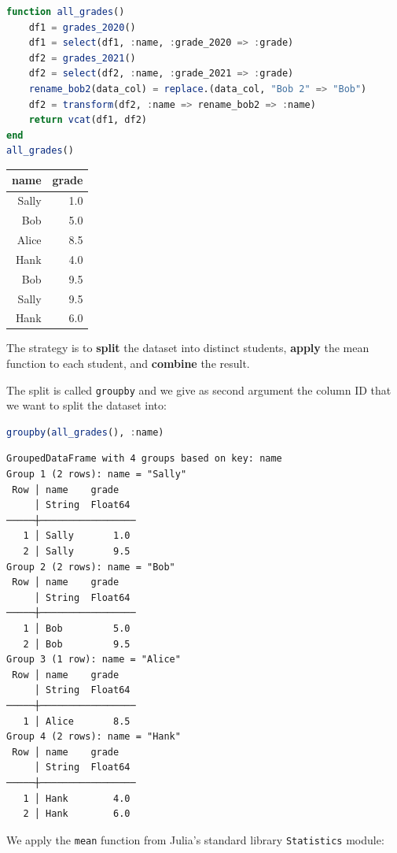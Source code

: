 \documentclass[
  notoc %
]{tufte-book}
\newcommand{\passthrough}[1]{#1}
\begin{document}
\begin{lstlisting}[language=Julia]
function all_grades()
    df1 = grades_2020()
    df1 = select(df1, :name, :grade_2020 => :grade)
    df2 = grades_2021()
    df2 = select(df2, :name, :grade_2021 => :grade)
    rename_bob2(data_col) = replace.(data_col, "Bob 2" => "Bob")
    df2 = transform(df2, :name => rename_bob2 => :name)
    return vcat(df1, df2)
end
all_grades()
\end{lstlisting}

\begin{longtable}[]{@{}rr@{}}
\toprule
name & grade \\
\midrule
\endhead
Sally & 1.0 \\
Bob & 5.0 \\
Alice & 8.5 \\
Hank & 4.0 \\
Bob & 9.5 \\
Sally & 9.5 \\
Hank & 6.0 \\
\bottomrule
\end{longtable}

The strategy is to \textbf{split} the dataset into distinct students,
\textbf{apply} the mean function to each student, and \textbf{combine}
the result.

The split is called \passthrough{\lstinline!groupby!} and we give as
second argument the column ID that we want to split the dataset into:

\begin{lstlisting}[language=Julia]
groupby(all_grades(), :name)
\end{lstlisting}

\begin{lstlisting}
GroupedDataFrame with 4 groups based on key: name
Group 1 (2 rows): name = "Sally"
 Row │ name    grade
     │ String  Float64
─────┼─────────────────
   1 │ Sally       1.0
   2 │ Sally       9.5
Group 2 (2 rows): name = "Bob"
 Row │ name    grade
     │ String  Float64
─────┼─────────────────
   1 │ Bob         5.0
   2 │ Bob         9.5
Group 3 (1 row): name = "Alice"
 Row │ name    grade
     │ String  Float64
─────┼─────────────────
   1 │ Alice       8.5
Group 4 (2 rows): name = "Hank"
 Row │ name    grade
     │ String  Float64
─────┼─────────────────
   1 │ Hank        4.0
   2 │ Hank        6.0
\end{lstlisting}

We apply the \passthrough{\lstinline!mean!} function from Julia's
standard library \passthrough{\lstinline!Statistics!} module:
\end{document}
